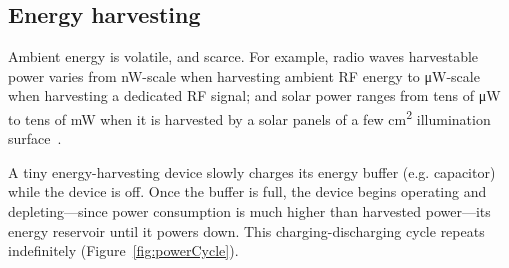 




\subsection{Energy harvesting}
Ambient energy is volatile, and scarce. For example, radio waves harvestable power varies from \si{\nano\watt}-scale when harvesting ambient RF energy to \si{\uW}-scale when harvesting a dedicated RF signal; and solar power ranges from tens of \si{\uW} to tens of \si{\mW} when it is harvested by a solar panels of a few \si{\cm^2} illumination surface~\cite{lucia2017intermittent,rao2017ambient}.%

A tiny energy-harvesting device slowly charges its energy buffer (e.g. capacitor) while the device is off. Once the buffer is full, the device begins operating and depleting---since power consumption is much higher than harvested power---its energy reservoir until it powers down. This charging-discharging cycle repeats indefinitely (Figure~\ref{fig:powerCycle}). 

